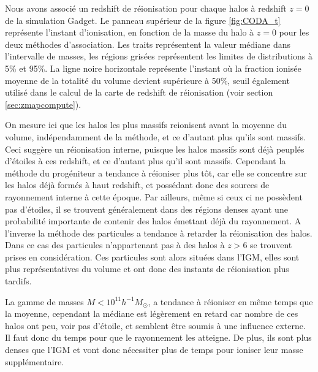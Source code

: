 Nous avons associé un redshift de réionisation pour chaque halos à redshift $z=0$ de la simulation Gadget.
Le panneau supérieur de la figure \ref{fig:CODA_t} représente l'instant d'ionisation, en fonction de la masse du halo à $z=0$ pour les deux méthodes d'association.
Les traits représentent la valeur médiane dans l'intervalle de masses, les régions grisées représentent les limites de distributions à 5\% et 95\%.
La ligne noire horizontale représente l'instant où la fraction ionisée moyenne de la totalité du volume devient supérieure à 50\%, seuil également utilisé dans le calcul de la carte de redshift de réionisation (voir section \ref{sec:zmapcompute}).

On mesure ici que les halos les plus massifs reionisent avant la moyenne du volume, indépendamment de la méthode, et ce d'autant plus qu'ils sont massifs.
Ceci suggère un réionisation interne, puisque les halos massifs sont déjà peuplés d'étoiles à ces redshift, et ce d'autant plus qu'il sont massifs.
Cependant la méthode du progéniteur a tendance à réioniser plus tôt, car elle se concentre sur les halos déjà formés à haut redshift, et possédant donc des sources de rayonnement interne à cette époque.
Par ailleurs, même si ceux ci ne possèdent pas d'étoiles, il se trouvent généralement dans des régions denses ayant une probabilité importante de contenir des halos émettant déjà du rayonnement.
A l'inverse la méthode des particules a tendance à retarder la réionisation des halos. 
Dans ce cas des particules n'appartenant pas à des halos à $z>6$ se trouvent prises en considération.
Ces particules sont alors situées dans l'\ac{IGM}, elles sont plus représentatives du volume et ont donc des instants de réionisation plus tardifs.

La gamme de masses $M <10^{11} h^{-1}M_\odot$, a tendance à réioniser en même temps que la moyenne, cependant la médiane est légèrement en retard car nombre de ces halos ont peu, voir pas d'étoile, et semblent être soumis à une influence externe.
Il faut donc du temps pour que le rayonnement les atteigne.
De plus, ils sont plus denses que l'\ac{IGM} et vont donc nécessiter plus de temps pour ioniser leur masse supplémentaire.




